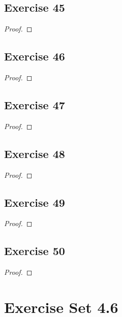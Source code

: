\documentclass[14pt]{extarticle}
\begin{document}
\subsection{Exercise 45}

\begin{proof}

\end{proof}

\subsection{Exercise 46}

\begin{proof}

\end{proof}

\subsection{Exercise 47}

\begin{proof}

\end{proof}

\subsection{Exercise 48}

\begin{proof}

\end{proof}

\subsection{Exercise 49}

\begin{proof}

\end{proof}

\subsection{Exercise 50}

\begin{proof}

\end{proof}

\section{Exercise Set 4.6}
\end{document}

